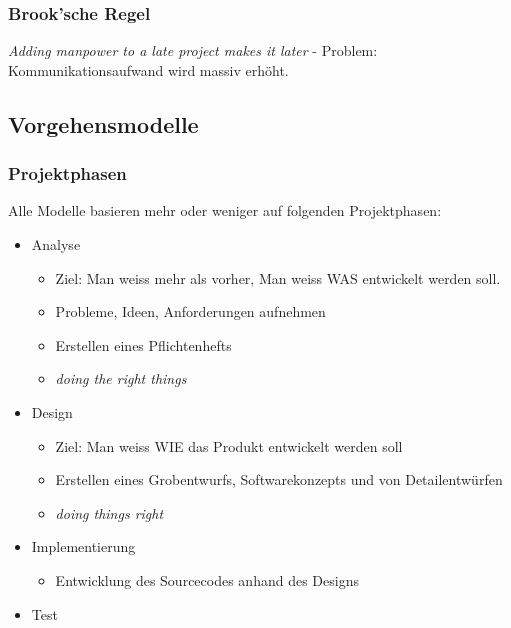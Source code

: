 \subsubsection{Brook'sche Regel}
\textit{Adding manpower to a late project makes it later}  -  
Problem: Kommunikationsaufwand wird massiv erhöht.



\subsection{Vorgehensmodelle}

\subsubsection{Projektphasen}
	Alle Modelle basieren mehr oder weniger auf folgenden Projektphasen:
	\begin{itemize}
		\item Analyse
			\begin{itemize}
				\item Ziel: Man weiss mehr als vorher, Man weiss WAS entwickelt werden soll.
				\item Probleme, Ideen, Anforderungen aufnehmen
				\item Erstellen eines Pflichtenhefts
				\item \textit{doing the right things}
			\end{itemize}
		\item Design
			\begin{itemize}
				\item Ziel: Man weiss WIE das Produkt entwickelt werden soll
				\item Erstellen eines Grobentwurfs, Softwarekonzepts und von Detailentwürfen
				\item \textit{doing things right}
			\end{itemize}
		\item Implementierung
			\begin{itemize}
				\item Entwicklung des Sourcecodes anhand des Designs
			\end{itemize}
		\item Test
	\end{itemize}

